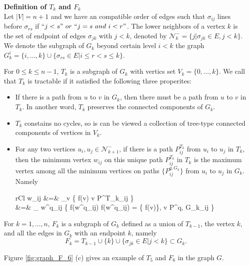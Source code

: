 \documentclass[a4paper,12pt]{article}
\numberwithin{equation}{section}
\DeclareMathOperator*{\argmin}{arg\,min}
\DeclareMathOperator*{\argmax}{arg\,max}
\begin{document}
	
	\noindent \textbf{Definition of $T_k$ and $F_{k}$}\\
	
	Let $\vert V \vert = n+1$ and we have an compatible order of edges such that $\sigma_{ij}$ lines before $\sigma_{rs}$ if $``j<s" \  or \  ``j=s \ and \ i<r"$.	The lower neighbors of a vertex $k$ is the set of endpoint of edges $\sigma_{jk}$ with $j<k$, denoted by $\mathcal{N}^{-}_{k} = \{j \vert \sigma_{jk} \in E, j<k \}$. We denote the subgraph of $G_k$ beyond certain level $i<k$ the graph $G_k^i = \{i,\ldots,k\} \cup \{ \sigma_{rs} \in E \vert i \leq r < s \leq k \}$. 
	
	For $0\leq k \leq n-1$, $T_k$ is a subgraph of $G_k$ with vertics set $V_k = \{0,\ldots, k\}$.	We call that $T_k$ is tractable if it satisfied the following three properites:
	\begin{itemize}
	 \item If there is a path from $u$ to $v$ in $G_k$, then there must be a path from $u$ to $v$ in $T_k$. In another word, $T_k$ preserves the connected components of $G_k$.
	 
	 \item $T_k$ constains no cycles, so is can be viewed a collection of tree-type connected components of vertices in $V_k$.
	 
	 \item For any two vertices $u_i,u_j \in \mathcal{N}^{-}_{k+1}$, if there is a path $P^{T_k}_{ij}$ from $u_i$ to $u_j$ in $T_k$, then the minimum vertex $w_{ij}$ on this unique path $P^{T_k}_{ij}$ in $T_k$ is the maximum vertex among all the minimum vertices on paths $\{P^{q,G_k}_{ij}\}$ from $u_i$ to $u_j$ in $G_k$.	 Namely
	  \begin{IEEEeqnarray*}{rCl}
	    w_{ij} &=& \argmin_{v} \{ f(v) \vert v \in P^{T_k}_{ij} \} \\
	    &=& \argmax_{ w^q_{ij} } \{ f(w^q_{ij}) \vert f(w^q_{ij}) = \min \{ f(v)\}, \forall v \in P^{q, G_k}_{ij} \}
	  \end{IEEEeqnarray*}
	\end{itemize}
	
	For $k = 1,\ldots, n$, $F_{k}$ is a subgraph of $G_{k}$ defined as a union of $T_{k-1}$, the vertex ${k}$, and all the edges in $G_{k}$ with an endpoint $k$, namely
	$$ F_{k} = T_{k-1} \cup \{k\} \cup \{ \sigma_{jk} \in E \vert j<k \} \subset G_{k}.$$	

	Figure \ref{fig:graph_F_6} (c) gives an example of $T_5$ and $F_6$ in the graph $G$.\\
	
\end{document}
